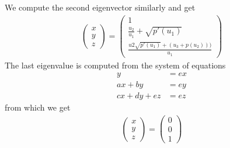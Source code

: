 We compute the second eigenvector similarly and get 
\begin{align*}
\begin{pmatrix}
x \\ y \\ z
\end{pmatrix} = \begin{pmatrix}
1 \\
 \frac{u_2}{u_1} + \sqrt{p'(u_1 )} \\
 \frac{u2 \sqrt{p'(u_1)}+(u_3+p(u_2)))}{u_1} 
\end{pmatrix}
\end{align*}
The last eigenvalue is computed from the system of equations
\begin{align*}
y &= e x \\
ax + by &= e y \\
cx + dy + ez &= e z
\end{align*}
from which we get
\begin{align*}
\begin{pmatrix}
x \\ y \\ z
\end{pmatrix} = \begin{pmatrix}
0 \\ 0 \\ 1
\end{pmatrix}
\end{align*}
